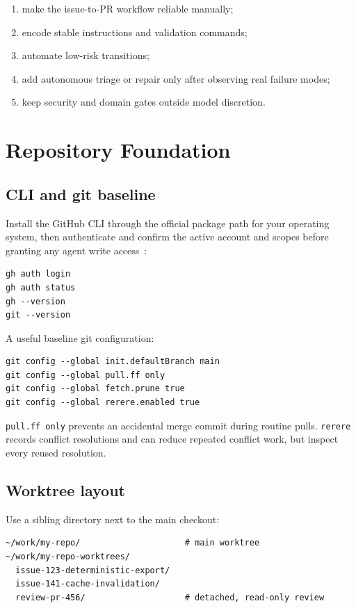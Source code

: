 \documentclass[11pt]{article}
\newcommand{\co}[1]{\lstinline[basicstyle=\ttfamily\color{gwInk}]{#1}}
\begin{document}
\begin{enumerate}
  \item make the issue-to-PR workflow reliable manually;
  \item encode stable instructions and validation commands;
  \item automate low-risk transitions;
  \item add autonomous triage or repair only after observing real failure modes;
  \item keep security and domain gates outside model discretion.
\end{enumerate}

\section{Repository Foundation}

\subsection{CLI and git baseline}

Install the GitHub CLI through the official package path for your operating system, then
authenticate and confirm the active account and scopes before granting any agent write
access~\cite{github2026cli}:

\begin{lstlisting}[style=gw]
gh auth login
gh auth status
gh --version
git --version
\end{lstlisting}

A useful baseline git configuration:

\begin{lstlisting}[style=gw]
git config --global init.defaultBranch main
git config --global pull.ff only
git config --global fetch.prune true
git config --global rerere.enabled true
\end{lstlisting}

\co{pull.ff only} prevents an accidental merge commit during routine pulls. \co{rerere} records
conflict resolutions and can reduce repeated conflict work, but inspect every reused resolution.

\subsection{Worktree layout}

Use a sibling directory next to the main checkout:

\begin{lstlisting}[style=gw]
~/work/my-repo/                     # main worktree
~/work/my-repo-worktrees/
  issue-123-deterministic-export/
  issue-141-cache-invalidation/
  review-pr-456/                    # detached, read-only review
\end{lstlisting}
\end{document}
